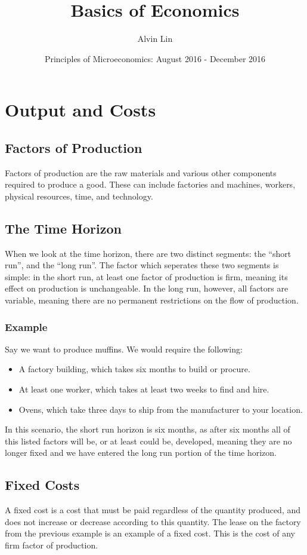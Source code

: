 \documentclass[letterpaper, 12pt]{article}
\title{Basics of Economics}
\author{Alvin Lin}
\date{Principles of Microeconomics: August 2016 - December 2016}
\begin{document}
\maketitle

\section{Output and Costs}

\subsection{Factors of Production}
Factors of production are the raw materials and various other components
required to produce a good. These can include factories and machines, workers,
physical resources, time, and technology.

\subsection{The Time Horizon}
When we look at the time horizon, there are two distinct segments: the ``short
run'', and the ``long run''. The factor which seperates these two segments is
simple: in the short run, at least one factor of production is firm, meaning
its effect on production is unchangeable. In the long run, however, all factors
are variable, meaning there are no permanent restrictions on the flow of
production.

\subsubsection{Example}
Say we want to produce muffins. We would require the following:
\begin{itemize}
  \item A factory building, which takes six months to build or procure.
  \item At least one worker, which takes at least two weeks to find and hire.
  \item Ovens, which take three days to ship from the manufacturer to your
        location.
\end{itemize}
In this scenario, the short run horizon is six months, as after six months
all of this listed factors will be, or at least could be, developed, meaning
they are no longer fixed and we have entered the long run portion of the
time horizon.

\subsection{Fixed Costs}
A fixed cost is a cost that must be paid regardless of the quantity produced,
and does not increase or decrease according to this quantity. The lease on
the factory from the previous example is an example of a fixed cost. This is
the cost of any firm factor of production.
\end{document}
